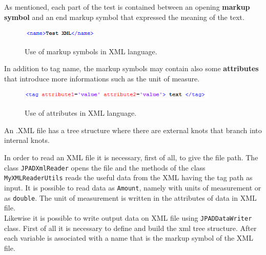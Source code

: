 As mentioned, each part of the test is contained between an opening {\bfseries markup symbol} and an end markup symbol that expressed the meaning of the text.\\

\begin{figure}[H]
\centering
{\includegraphics[height=0.31cm]{Immagini/xml1.jpg}} 
\caption{Use of markup symbols in XML language.}
\end{figure}

In addition to tag name, the markup symbols may contain also some {\bfseries attributes} that introduce more informations such as the unit of measure.\\

\begin{figure}[H]
\centering
{\includegraphics[height=0.4cm]{Immagini/xml2.jpg}} 
\caption{Use of attributes in XML language.}
\end{figure}

An .XML file has a tree structure where there are external knots that branch into internal knots.
%

In order to read an XML file it is necessary, first of all, to give the file path. The class \texttt{JPADXmlReader} opens the file and  the methods of the class \texttt{MyXMLReaderUtils} reads the useful data from the XML having the tag path as input. It is possible to read data as \texttt{Amount}, namely with units of measurement or as \texttt{double}. The unit of measurement is written in the attributes of data in XML file.\\ 

Likewise it is possible to write output data on XML file using \texttt{JPADDataWriter} class. First of all it is necessary to define and build the xml tree structure. After each variable is associated with a name that is the markup symbol of the XML file.

